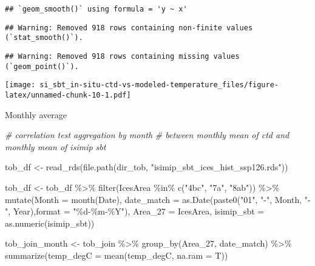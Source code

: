 \documentclass[
]{article}
\newenvironment{Shaded}{\begin{snugshade}}{\end{snugshade}}
\newcommand{\AttributeTok}[1]{\textcolor[rgb]{0.77,0.63,0.00}{#1}}
\newcommand{\CommentTok}[1]{\textcolor[rgb]{0.56,0.35,0.01}{\textit{#1}}}
\newcommand{\FunctionTok}[1]{\textcolor[rgb]{0.00,0.00,0.00}{#1}}
\newcommand{\NormalTok}[1]{#1}
\newcommand{\OtherTok}[1]{\textcolor[rgb]{0.56,0.35,0.01}{#1}}
\newcommand{\SpecialCharTok}[1]{\textcolor[rgb]{0.00,0.00,0.00}{#1}}
\newcommand{\StringTok}[1]{\textcolor[rgb]{0.31,0.60,0.02}{#1}}
\begin{document}
\begin{verbatim}
## `geom_smooth()` using formula = 'y ~ x'
\end{verbatim}

\begin{verbatim}
## Warning: Removed 918 rows containing non-finite values (`stat_smooth()`).
\end{verbatim}

\begin{verbatim}
## Warning: Removed 918 rows containing missing values (`geom_point()`).
\end{verbatim}

\texttt{[image: si\_sbt\_in-situ-ctd-vs-modeled-temperature\_files/figure-latex/unnamed-chunk-10-1.pdf]}

Monthly average

\begin{Shaded}
\begin{Highlighting}[]
\CommentTok{\# correlation test aggregation by month}
\CommentTok{\# between monthly mean of ctd and monthly mean of isimip sbt}

\NormalTok{tob\_df }\OtherTok{\textless{}{-}} \FunctionTok{read\_rds}\NormalTok{(}\FunctionTok{file.path}\NormalTok{(dir\_tob, }\StringTok{"isimip\_sbt\_ices\_hist\_ssp126.rds"}\NormalTok{))}

\NormalTok{tob\_df }\OtherTok{\textless{}{-}}\NormalTok{ tob\_df }\SpecialCharTok{\%\textgreater{}\%}
  \FunctionTok{filter}\NormalTok{(IcesArea }\SpecialCharTok{\%in\%} \FunctionTok{c}\NormalTok{(}\StringTok{"4bc"}\NormalTok{, }\StringTok{"7a"}\NormalTok{, }\StringTok{"8ab"}\NormalTok{)) }\SpecialCharTok{\%\textgreater{}\%}
  \FunctionTok{mutate}\NormalTok{(}\AttributeTok{Month =} \FunctionTok{month}\NormalTok{(Date),}
         \AttributeTok{date\_match =} \FunctionTok{as.Date}\NormalTok{(}\FunctionTok{paste0}\NormalTok{(}\StringTok{"01"}\NormalTok{, }\StringTok{"{-}"}\NormalTok{, Month, }\StringTok{"{-}"}\NormalTok{, Year),}\AttributeTok{format =} \StringTok{"\%d{-}\%m{-}\%Y"}\NormalTok{), }
         \AttributeTok{Area\_27 =}\NormalTok{ IcesArea,}
         \AttributeTok{isimip\_sbt =} \FunctionTok{as.numeric}\NormalTok{(isimip\_sbt)) }

\NormalTok{tob\_join\_month }\OtherTok{\textless{}{-}}\NormalTok{ tob\_join }\SpecialCharTok{\%\textgreater{}\%} 
  \FunctionTok{group\_by}\NormalTok{(Area\_27, date\_match) }\SpecialCharTok{\%\textgreater{}\%} 
  \FunctionTok{summarize}\NormalTok{(}\AttributeTok{temp\_degC =} \FunctionTok{mean}\NormalTok{(temp\_degC, }\AttributeTok{na.ram =}\NormalTok{ T))}
\end{Highlighting}
\end{Shaded}
\end{document}

